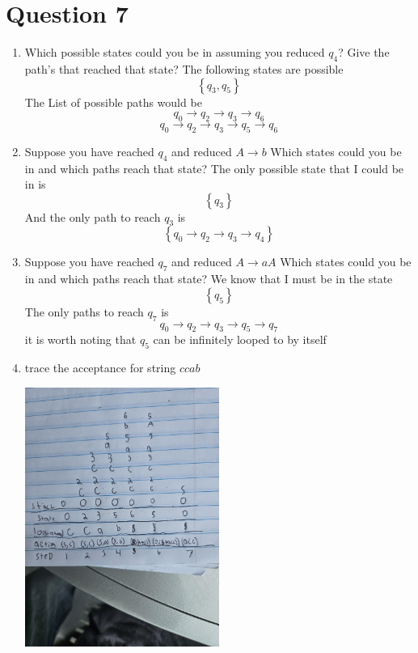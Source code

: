 \documentclass{article}
\begin{document}
    \section*{Question 7}
    \begin{enumerate}
	\item Which possible states could you be in assuming you reduced $q_4$? Give the path's that reached that state?
	The following states are possible
		    \[\left\{ q_3, q_5 \right\}\]
	The List of possible paths would be
		\[q_0 \rightarrow q_2 \rightarrow q_3 \rightarrow q_6\]
		\[q_0 \rightarrow q_2 \rightarrow q_3 \rightarrow q_5 \rightarrow q_6\]
	\item Suppose you have reached $q_4$ and reduced $A \rightarrow b$ Which states could you be in and which paths reach that state?
	The only possible state that I could be in is
		\[ \left\{ q_3 \right\}\]
	And the only path to reach $q_3$ is
		\[ \left\{ q_0 \rightarrow q_2 \rightarrow q_3 \rightarrow q_4 \right\}\]
	\item Suppose you have reached $q_7$ and reduced $A \rightarrow aA$ Which states could you be in and which paths reach that state?
		We know that I must be in the state
		    \[\left\{ q_5 \right\}\]
		The only paths to reach $q_7$ is
		\[q_0 \rightarrow q_2 \rightarrow q_3 \rightarrow q_5 \rightarrow q_7 \]
		it is worth noting that $q_5$ can be infinitely looped to by itself
	\newpage
	\item trace the acceptance for string $ccab$
        \begin{center}
            \includegraphics[width=0.5\textwidth, angle=0]{figures/DFA5.jpg}
        \end{center}

    \end{enumerate}
\end{document}
